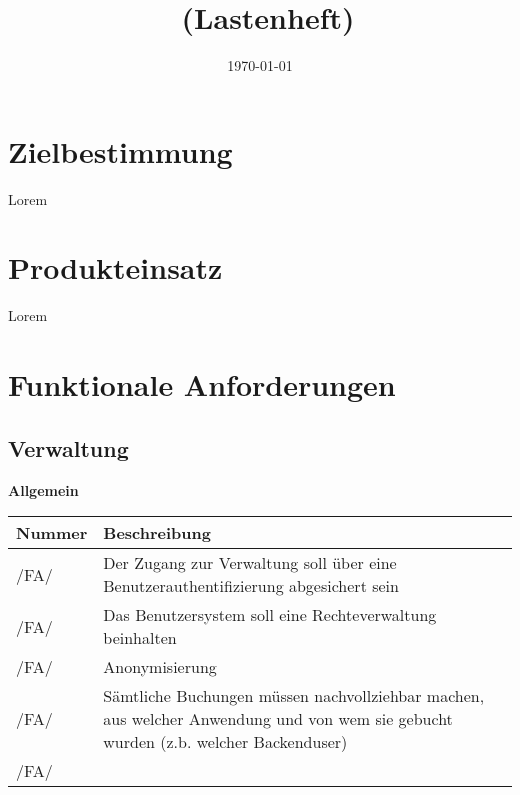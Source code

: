 \documentclass[a4paper,12pt]{article}
\title{\projektName~(Lastenheft)}
\author{\authorName}
\date{\today}
\newcommand\addrow[2]{#1 &#2\\ }
\newcommand\addheading[2]{#1 &#2\\ \hline}
\newcommand\tabularhead{\begin{tabular}{lp{13cm}}
\hline
}
\newenvironment{usecase}{\tabularhead}
{\hline\end{tabular}}
\begin{document}
 \setcounter{page}{2}
 \tableofcontents          %
 \clearpage
 
\section{Zielbestimmung}
Lorem 

\section{Produkteinsatz}
Lorem 

\section{Funktionale Anforderungen}
\subsection{Verwaltung}
\textbf{Allgemein}\\
\begin{usecase}
  \addheading{Nummer}{Beschreibung} 
  \addrow{/FA/}{Der Zugang zur Verwaltung soll über eine Benutzerauthentifizierung abgesichert sein}
  \addrow{/FA/}{Das Benutzersystem soll eine Rechteverwaltung beinhalten}
  \addrow{/FA/}{Anonymisierung}
  \addrow{/FA/}{Sämtliche Buchungen müssen nachvollziehbar machen, aus welcher Anwendung und von wem sie gebucht wurden (z.b. welcher Backenduser)}
  \addrow{/FA/}{}
\end{usecase}
\end{document}
